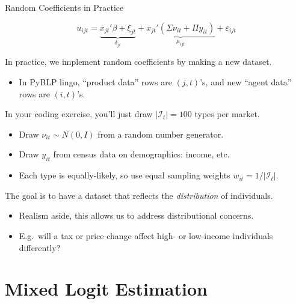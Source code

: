 \documentclass[aspectratio=169,t,11pt,table]{beamer}
\begin{document}
\begin{frame}{Random Coefficients in Practice}
    \vspace{-\baselineskip}
    \begin{minipage}[c][4\baselineskip][c]{\textwidth}
        \begin{equation*}
            u_{ijt} = \underbrace{x_{jt}'\beta + \xi_{jt}}_{\textstyle\delta_{jt}} + \underbrace{x_{jt}'(\Sigma \nu_{it} + \Pi y_{it})}_{\textstyle\mu_{ijt}} + \varepsilon_{ijt}
        \end{equation*}
    \end{minipage}
    \vspace{-0.5\baselineskip}
    \begin{wideitemize}
        \item In practice, we implement random coefficients by making a new dataset.
        \begin{itemize}
            \item In PyBLP lingo, ``product data'' rows are $(j, t)$'s, and new ``agent data'' rows are $(i, t)$'s.
        \end{itemize}
        \pause
        \item In your coding exercise, you'll just draw $|\mathcal{I}_t| = 100$ types per market.
        \begin{itemize}
            \item Draw $\nu_{it} \sim N(0, I)$ from a random number generator.
            \item Draw $y_{it}$ from census data on demographics: income, etc.
            \item Each type is equally-likely, so use equal sampling weights $w_{it} = 1 / |\mathcal{I}_t|$.
        \end{itemize}
        \pause
        \item The goal is to have a dataset that reflects the \textit{distribution} of individuals.
        \begin{itemize}
            \item Realism aside, this allows us to address distributional concerns.
            \item E.g.\ will a tax or price change affect high- or low-income individuals differently?
        \end{itemize}
    \end{wideitemize}
\end{frame}

\section{Mixed Logit Estimation}
\end{document}
